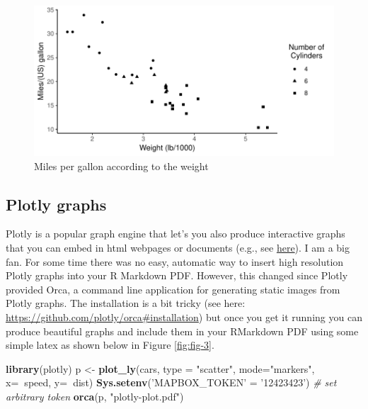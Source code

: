 \documentclass[12pt,]{article}
\newenvironment{Shaded}{\begin{snugshade}}{\end{snugshade}}
\newcommand{\KeywordTok}[1]{\textcolor[rgb]{0.13,0.29,0.53}{\textbf{#1}}}
\newcommand{\DataTypeTok}[1]{\textcolor[rgb]{0.13,0.29,0.53}{#1}}
\newcommand{\StringTok}[1]{\textcolor[rgb]{0.31,0.60,0.02}{#1}}
\newcommand{\CommentTok}[1]{\textcolor[rgb]{0.56,0.35,0.01}{\textit{#1}}}
\newcommand{\OperatorTok}[1]{\textcolor[rgb]{0.81,0.36,0.00}{\textbf{#1}}}
\newcommand{\NormalTok}[1]{#1}
\theoremstyle{definition}
\theoremstyle{definition}
\theoremstyle{definition}
\theoremstyle{remark}
\begin{document}
\begin{figure}[H]

{\centering \includegraphics{paper_files/figure-latex/fig-2-1} 

}

\caption{Miles per gallon according to the weight}\label{fig:fig-2}
\end{figure}

\subsection{Plotly graphs}\label{plotly-graphs}

Plotly is a popular graph engine that let's you also produce interactive
graphs that you can embed in html webpages or documents (e.g., see
\href{https://paulcbauer.shinyapps.io/visualizing-causal-scenarios/}{here}).
I am a big fan. For some time there was no easy, automatic way to insert
high resolution Plotly graphs into your R Markdown PDF. However, this
changed since Plotly provided Orca, a command line application for
generating static images from Plotly graphs. The installation is a bit
tricky (see here: \url{https://github.com/plotly/orca\#installation})
but once you get it running you can produce beautiful graphs and include
them in your RMarkdown PDF using some simple latex as shown below in
Figure \ref{fig:fig-3}.

\begin{Shaded}
\begin{Highlighting}[]
\KeywordTok{library}\NormalTok{(plotly)}
\NormalTok{p <-}\StringTok{ }\KeywordTok{plot_ly}\NormalTok{(cars, }\DataTypeTok{type =} \StringTok{"scatter"}\NormalTok{, }\DataTypeTok{mode=}\StringTok{"markers"}\NormalTok{,}
        \DataTypeTok{x=}\OperatorTok{~}\NormalTok{speed, }
        \DataTypeTok{y=}\OperatorTok{~}\NormalTok{dist)}
\KeywordTok{Sys.setenv}\NormalTok{(}\StringTok{'MAPBOX_TOKEN'}\NormalTok{ =}\StringTok{ '12423423'}\NormalTok{) }\CommentTok{# set arbitrary token}
\KeywordTok{orca}\NormalTok{(p, }\StringTok{"plotly-plot.pdf"}\NormalTok{)}
\end{Highlighting}
\end{Shaded}
\end{document}
